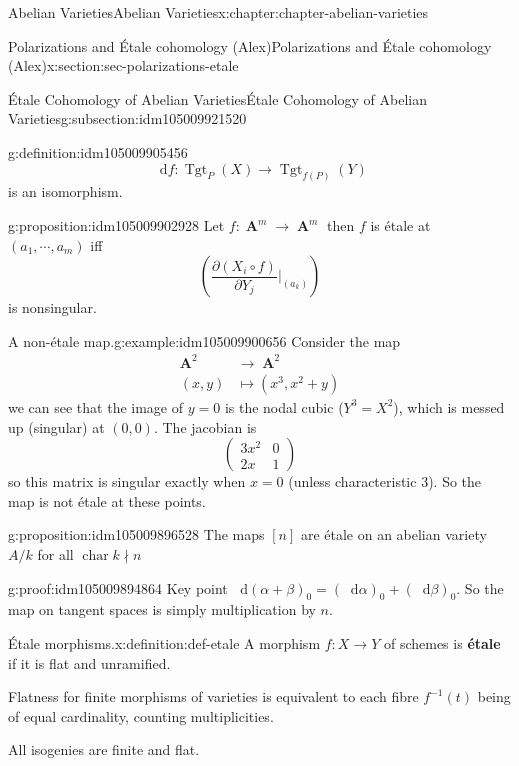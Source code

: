 \documentclass[oneside,10pt,]{book}
\newcommand{\terminology}[1]{\textbf{#1}}
\numberwithin{equation}{section}
\newcommand{\diff}{\mathop{}\!\mathrm{d}}
\newcommand{\lb}{[}
\newcommand{\rb}{]}
\DeclareMathOperator{\Tgt}{Tgt}
\DeclareMathOperator{\characteristic}{char}
\DeclareMathOperator{\aff}{\mathbf{A}}
\newcommand{\amp}{&}
\begin{document}
\begin{chapterptx}{Abelian Varieties}{}{Abelian Varieties}{}{}{x:chapter:chapter-abelian-varieties}
\begin{sectionptx}{Polarizations and Étale cohomology (Alex)}{}{Polarizations and Étale cohomology (Alex)}{}{}{x:section:sec-polarizations-etale}
\begin{subsectionptx}{Étale Cohomology of Abelian Varieties}{}{Étale Cohomology of Abelian Varieties}{}{}{g:subsection:idm105009921520}
\begin{definition}{}{g:definition:idm105009905456}
\begin{equation*}
\diff f\colon\Tgt_{P}(X) \to \Tgt_{f(P)} (Y)
\end{equation*}
is an isomorphism.%
\end{definition}
\begin{proposition}{}{}{g:proposition:idm105009902928}%
Let \(f \colon \aff^m\to \aff^m\) then \(f\) is étale at \((a_1, \cdots, a_m)\) iff%
\begin{equation*}
\left(\frac{\partial(X_i \circ f)}{\partial Y_j}|_{(a_k)} \right)
\end{equation*}
is nonsingular.%
\end{proposition}
\begin{example}{A non-étale map.}{g:example:idm105009900656}%
Consider the map%
\begin{align*}
\aff^2 \amp\to \aff^2\\
(x,y) \amp\mapsto (x^3, x^2 + y)
\end{align*}
we can see that the image of \(y= 0\) is the nodal cubic (\(Y^3 = X^2\)), which is messed up (singular) at \((0,0)\). The jacobian is%
\begin{equation*}
\begin{pmatrix} 3x^2 \amp 0 \\ 2x \amp 1\end{pmatrix}
\end{equation*}
so this matrix is singular exactly when \(x= 0\) (unless characteristic 3). So the map is not étale at these points.%
\end{example}
\begin{proposition}{}{}{g:proposition:idm105009896528}%
The maps \(\lb n\rb\) are étale on an abelian variety \(A/k\) for all  \(\characteristic{k} \nmid n\)%
\end{proposition}
\begin{proofptx}{}{g:proof:idm105009894864}
Key point \(\diff (\alpha+ \beta)_0 = (\diff \alpha )_0 + (\diff \beta)_0\). So the map on tangent spaces is simply multiplication by \(n\).%
\end{proofptx}
\begin{definition}{Étale morphisms.}{x:definition:def-etale}%
A morphism \(f\colon X\to Y\) of schemes is \terminology{étale} if it is flat and unramified.%
\par
Flatness for finite morphisms of varieties is equivalent to each fibre \(f^{-1}(t)\) being of equal cardinality, counting multiplicities.%
\end{definition}
All isogenies are finite and flat.%

\end{subsectionptx}
\end{sectionptx}
\end{chapterptx}
\end{document}
